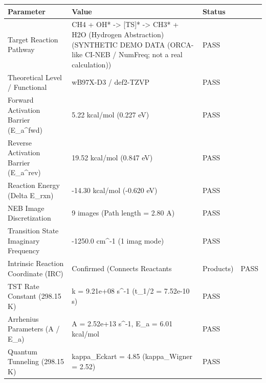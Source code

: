 \begin{tabular}{lll}
\toprule
Parameter & Value & Status \\
\midrule
Target Reaction Pathway & CH4 + OH* -> [TS]* -> CH3* + H2O (Hydrogen Abstraction) (SYNTHETIC DEMO DATA (ORCA-like CI-NEB / NumFreq; not a real calculation)) & PASS \\
Theoretical Level / Functional & wB97X-D3 / def2-TZVP & PASS \\
Forward Activation Barrier (E_a^fwd) & 5.22 kcal/mol (0.227 eV) & PASS \\
Reverse Activation Barrier (E_a^rev) & 19.52 kcal/mol (0.847 eV) & PASS \\
Reaction Energy (Delta E_rxn) & -14.30 kcal/mol (-0.620 eV) & PASS \\
NEB Image Discretization & 9 images (Path length = 2.80 A) & PASS \\
Transition State Imaginary Frequency & -1250.0 cm^-1 (1 imag mode) & PASS \\
Intrinsic Reaction Coordinate (IRC) & Confirmed (Connects Reactants & Products) & PASS \\
TST Rate Constant (298.15 K) & k = 9.21e+08 s^-1 (t_1/2 = 7.52e-10 s) & PASS \\
Arrhenius Parameters (A / E_a) & A = 2.52e+13 s^-1, E_a = 6.01 kcal/mol & PASS \\
Quantum Tunneling (298.15 K) & kappa_Eckart = 4.85 (kappa_Wigner = 2.52) & PASS \\
\bottomrule
\end{tabular}
